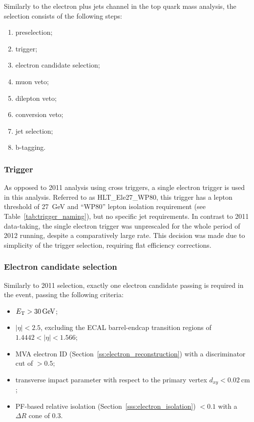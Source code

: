 Similarly to the electron plus jets channel in the top quark mass analysis, the selection consists of the following
steps:

\begin{enumerate}[topsep=\parskip, parsep=\parskip, itemsep=\parskip, leftmargin=\leftmargin]
	\item preselection;
	\item trigger;
	\item electron candidate selection;
	\item muon veto;
	\item dilepton veto;
	\item conversion veto;
	\item jet selection;
	\item b-tagging.
\end{enumerate}


\subsubsection*{Trigger}
As opposed to 2011 analysis using cross triggers, a single electron trigger is used in this analysis. Referred to as
HLT\_Ele27\_WP80, this trigger has a lepton \pt threshold of \SI{27}{\GeV} and ``WP80'' lepton isolation requirement
(see Table~\ref{tab:trigger_naming}), but no specific jet requirements. In contrast to 2011 data-taking, the single
electron trigger was unprescaled for the whole period of 2012 running, despite a comparatively large rate. This decision
was made due to simplicity of the trigger selection, requiring flat efficiency corrections.

\subsubsection*{Electron candidate selection}
Similarly to 2011 selection, exactly one electron candidate passing is required in the event, passing the following
criteria:

\begin{itemize}
	\item $\ET > \SI{30}{\GeV}$;
	\item $|\eta| < 2.5$, excluding the ECAL barrel-endcap transition regions of $1.4442 < |\eta| < 1.566$;
	\item MVA electron ID (Section~\ref{ss:electron_reconstruction}) with a discriminator cut of $>0.5$;
	\item transverse impact parameter with respect to the primary vertex $d_{xy} < \SI{0.02}{\cm}$;
	\item PF-based relative isolation (Section~\ref{sss:electron_isolation}) \reliso $< 0.1$ with a $\Delta
R$ cone of \num{0.3}.
\end{itemize}

